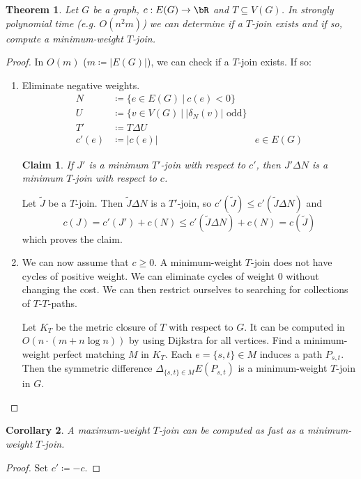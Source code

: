 \documentclass[11pt, a4paper]{article}
\newcommand{\abs}[1]{\left\lvert#1\right\rvert}
\newcommand{\set}[1]{\{#1\}}
\newtheorem{theorem}{Theorem}[section]
\newtheorem{cor}[theorem]{Corollary}
\newtheorem*{claim}{Claim}
\theoremstyle{remark}
\theoremstyle{definition}
\begin{document}
\begin{theorem}\label{thm:t-join-alg}
	Let $G$ be a graph, $c: E(G)\to\bR$ and $T\subseteq V(G)$. In strongly
	polynomial time (e.g. $O(n^2m)$) we can determine if a $T$-join exists and
	if so, compute a minimum-weight $T$-join.
\end{theorem}
\begin{proof}
	In $O(m)$ ($m\coloneqq\abs{E(G)}$), we can check if a $T$-join exists. If
	so:
	\begin{enumerate}
		\item Eliminate negative weights.
		\begin{align*}
			N     & \coloneqq\set{e\in E(G)\ |\ c(e)<0}                                   \\
			U     & \coloneqq\set{v\in V(G)\ |\ \abs{\delta_N(v)}\text{ odd}}             \\
			T'    & \coloneqq T\Delta U                                                   \\
			c'(e) & \coloneqq \abs{c(e)}                                      & e\in E(G)
		\end{align*}
		\begin{claim}
			If $J'$ is a minimum $T'$-join with respect to $c'$, then $J'\Delta N$
			is a minimum $T$-join with respect to $c$.
		\end{claim}
		Let $\tilde J$ be a $T$-join. Then $\tilde J\Delta N$ is a $T'$-join, so
		$c'(\tilde J)\leq c'(\tilde J\Delta N)$ and
		\[c(J)=c'(J')+c(N)\leq c'(\tilde J\Delta N)+c(N)=c(\tilde J)\]
		which proves the claim.

		\item We can now assume that $c\geq0$. A minimum-weight $T$-join does not
		have cycles of positive weight. We can eliminate cycles of weight 0
		without changing the cost. We can then restrict ourselves to
		searching for collections of $T$-$T$-paths.

		Let $K_T$ be the metric closure of $T$ with respect to $G$. It can be
		computed in $O(n\cdot(m+n\log n))$ by using Dijkstra for all
		vertices. Find a minimum-weight perfect matching $M$ in $K_T$. Each
		$e=\set{s,t} \in M$ induces a path $P_{s,t}$. Then the symmetric
		difference $\Delta_{\set{s,t}\in M}E(P_{s,t})$ is a minimum-weight
		$T$-join in $G$.
	\end{enumerate}
\end{proof}

\begin{cor}
	A maximum-weight $T$-join can be computed as fast as a minimum-weight
	$T$-join.
\end{cor}
\begin{proof}
	Set $c'\coloneqq -c$.
\end{proof}
\end{document}
